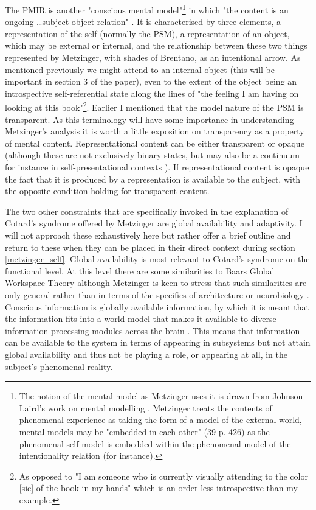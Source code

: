 The PMIR is another "conscious mental model"\footnote{The notion of the mental model as Metzinger uses it is drawn from Johnson-Laird's work on mental modelling \cite[p. xi; 38]{metzinger2003}. Metzinger treats the contents of phenomenal experience as taking the form of a model of the external world, mental models may be "embedded in each other" (39 p. 426) as the phenomenal self model is embedded within the phenomenal model of the intentionality relation (for instance).} in which "the content is an ongoing \ldots subject-object relation" \cite[p. 23]{metzinger2005}. It is characterised by three elements, a representation of the self (normally the PSM), a representation of an object, which may be external or internal, and the relationship between these two things represented by Metzinger, with shades of Brentano, as an intentional arrow. As mentioned previously we might attend to an internal object (this will be important in section 3 of the paper), even to the extent of the object being an introspective self-referential state along the lines of "the feeling I am having on looking at this book"\footnote{As opposed to "I am someone who is currently visually attending to the color [sic] of the book in my hands" \cite[p. 23]{metzinger2005} which is an order less introspective than my example.}.
Earlier I mentioned that the model nature of the PSM is transparent. As this terminology will have some importance in understanding Metzinger's analysis it is worth a little exposition on transparency as a property of mental content. Representational content can be either transparent or opaque (although these are not exclusively binary states, but may also be a continuum – for instance in self-presentational contexts \cite[p. 332]{metzinger2003}). If representational content is opaque the fact that it is produced by a representation is available to the subject, with the opposite condition holding for transparent content.

The two other constraints that are specifically invoked in the explanation of Cotard's syndrome offered by Metzinger are global availability and adaptivity. I will not approach these exhaustively here but rather offer a brief outline and return to these when they can be placed in their direct context during section \ref{metzinger_self}. Global availability is most relevant to Cotard's syndrome on the functional level. At this level there are some similarities to Baars Global Workspace Theory \cite{baars1988} although Metzinger is keen to stress that such similarities are only general rather than in terms of the specifics of architecture or neurobiology \cite[p. 120]{metzinger2003}. Conscious information is globally available information, by which it is meant that the information fits into a world-model that makes it available to diverse information processing modules across the brain \cite[p. 121]{metzinger2003}. This means that information can be available to the system in terms of appearing in subsystems but not attain global availability and thus not be playing a role, or appearing at all, in the subject's phenomenal reality.

